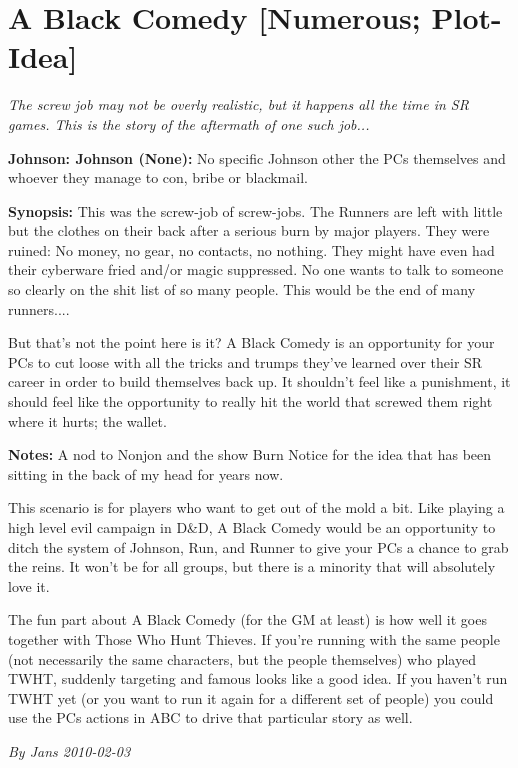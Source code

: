 \documentclass[letterpaper,twocolumn,10.5pt]{article}
\newenvironment{scenario}[6]
	{
		\section{#1 {\small[#2]}}
		\textit{#3}
		\def\TMPSCENARIO{#4 #5}
	}
	{\small\textit{By \TMPSCENARIO}}
\newcommand{\johnson}[2]{\textbf{Johnson: #1 (#2):}}
\newcommand{\synopsis}{\textbf{Synopsis: }}
\newcommand{\notes}{\textbf{Notes: }}
\begin{document}
\begin{scenario}{A Black Comedy}
	{Numerous; Plot-Idea}
	{ The screw job may not be overly realistic, but it happens all the time in SR games. This is the story of the aftermath of one such job...}
	{Jans}
	{2010-02-03}
	{https://forum.rpg.net/showthread.php?321504-Shadowrun-4th-101-Instant-Scenarios\&p=11636919#post11636919}

\johnson{Johnson}{None}  No specific Johnson other the PCs themselves and whoever they manage to con, bribe or blackmail.

\synopsis This was the screw-job of screw-jobs. The Runners are left with little but the clothes on their back after a serious burn by major players. They were ruined: No money, no gear, no contacts, no nothing. They might have even had their cyberware fried and/or magic suppressed. No one wants to talk to someone so clearly on the shit list of so many people. This would be the end of many runners....

But that's not the point here is it? A Black Comedy is an opportunity for your PCs to cut loose with all the tricks and trumps they've learned over their SR career in order to build themselves back up. It shouldn't feel like a punishment, it should feel like the opportunity to really hit the world that screwed them right where it hurts; the wallet.

\notes  A nod to Nonjon and the show Burn Notice for the idea that has been sitting in the back of my head for years now.

This scenario is for players who want to get out of the mold a bit. Like playing a high level evil campaign in D\&D, A Black Comedy would be an opportunity to ditch the system of Johnson, Run, and Runner to give your PCs a chance to grab the reins. It won't be for all groups, but there is a minority that will absolutely love it.

The fun part about A Black Comedy (for the GM at least) is how well it goes together with Those Who Hunt Thieves. If you're running with the same people (not necessarily the same characters, but the people themselves) who played TWHT, suddenly targeting and famous looks like a good idea. If you haven't run TWHT yet (or you want to run it again for a different set of people) you could use the PCs actions in ABC to drive that particular story as well. 

\end{scenario}
\end{document}
